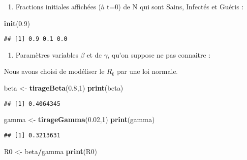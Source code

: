 \documentclass[
]{article}
\newenvironment{Shaded}{\begin{snugshade}}{\end{snugshade}}
\newcommand{\DecValTok}[1]{\textcolor[rgb]{0.00,0.00,0.81}{#1}}
\newcommand{\FloatTok}[1]{\textcolor[rgb]{0.00,0.00,0.81}{#1}}
\newcommand{\KeywordTok}[1]{\textcolor[rgb]{0.13,0.29,0.53}{\textbf{#1}}}
\newcommand{\NormalTok}[1]{#1}
\newcommand{\OperatorTok}[1]{\textcolor[rgb]{0.81,0.36,0.00}{\textbf{#1}}}
\newcommand{\StringTok}[1]{\textcolor[rgb]{0.31,0.60,0.02}{#1}}
\providecommand{\tightlist}{%
  \setlength{\itemsep}{0pt}\setlength{\parskip}{0pt}}
\begin{document}
\begin{enumerate}
\def\labelenumi{\alph{enumi}.}
\tightlist
\item
  Fractions initiales affichées (à t=0) de N qui sont Sains, Infectés et
  Guéris :
\end{enumerate}

\begin{Shaded}
\begin{Highlighting}[]
\KeywordTok{init}\NormalTok{(}\FloatTok{0.9}\NormalTok{)}
\end{Highlighting}
\end{Shaded}

\begin{verbatim}
## [1] 0.9 0.1 0.0
\end{verbatim}

\begin{enumerate}
\def\labelenumi{\alph{enumi}.}
\setcounter{enumi}{1}
\tightlist
\item
  Paramètres variables \(\beta\) et de \(\gamma\), qu'on suppose ne pas
  connaitre :
\end{enumerate}

Nous avons choisi de modéliser le \(R_0\) par une loi normale.

\begin{Shaded}
\begin{Highlighting}[]
\NormalTok{beta <-}\StringTok{ }\KeywordTok{tirageBeta}\NormalTok{(}\FloatTok{0.8}\NormalTok{,}\DecValTok{1}\NormalTok{)}
\KeywordTok{print}\NormalTok{(beta)}
\end{Highlighting}
\end{Shaded}

\begin{verbatim}
## [1] 0.4064345
\end{verbatim}

\begin{Shaded}
\begin{Highlighting}[]
\NormalTok{gamma <-}\StringTok{ }\KeywordTok{tirageGamma}\NormalTok{(}\FloatTok{0.02}\NormalTok{,}\DecValTok{1}\NormalTok{)}
\KeywordTok{print}\NormalTok{(gamma)}
\end{Highlighting}
\end{Shaded}

\begin{verbatim}
## [1] 0.3213631
\end{verbatim}

\begin{Shaded}
\begin{Highlighting}[]
\NormalTok{R0 <-}\StringTok{ }\NormalTok{beta}\OperatorTok{/}\NormalTok{gamma}
\KeywordTok{print}\NormalTok{(R0)}
\end{Highlighting}
\end{Shaded}
\end{document}
